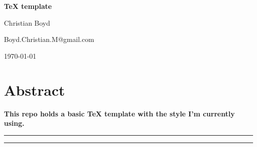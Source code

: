 \begin{center}{\Large \textbf{
TeX template
}}\end{center}

\begin{center}
Christian Boyd
\end{center}

\begin{center}
{\small \sf Boyd.Christian.M@gmail.com}
\end{center}

\begin{center}
\today
\end{center}


\section*{Abstract}
{\bf
This repo holds a basic TeX template with the style I'm currently using.
}

\vspace{10pt}
\noindent\rule{\textwidth}{1pt}
\tableofcontents
\noindent\rule{\textwidth}{1pt}
\vspace{10pt}